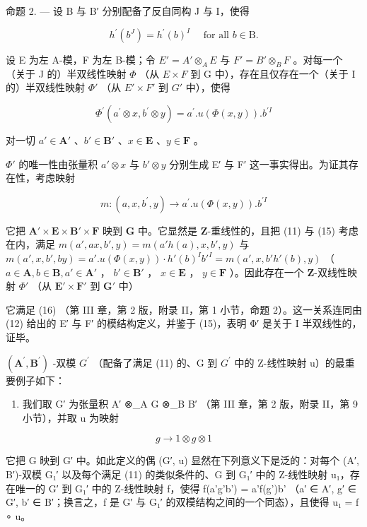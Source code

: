 命题 2. --- 设 B 与 B′ 分别配备了反自同构 J 与 I，使得

\[
h ^ {\prime} (b ^ {J}) = h ^ {\prime} (b) ^ {I} \quad \text { for all } b \in \mathrm{B}.\tag{15}
\]

设 E 为左 A-模，F 为左 B-模；令 \(E' = A' \otimes_{A} E\) 与 \(F' = B' \otimes_{B} F\) 。对每一个（关于 J 的）半双线性映射 \(\Phi\) （从 \(E \times F\) 到 G 中），存在且仅存在一个（关于 I 的）半双线性映射 \(\Phi'\) （从 \(E' \times F'\) 到 \(G'\) 中），使得

\[
\Phi^ {\prime} (a ^ {\prime} \otimes x, b ^ {\prime} \otimes y) = a ^ {\prime}. u (\Phi (x, y)). b ^ {\prime I}\tag{16}
\]

对一切 \(a' \in \mathbf{A}'\) 、\(b' \in \mathbf{B}'\) 、\(x \in \mathbf{E}\) 、\(y \in \mathbf{F}\) 。

\(\Phi'\) 的唯一性由张量积 \(a' \otimes x\) 与 \(b' \otimes y\) 分别生成 E′ 与 F′ 这一事实得出。为证其存在性，考虑映射

\[
m: (a, x, b ^ {\prime}, y) \rightarrow a ^ {\prime}. u (\Phi (x, y)). b ^ {\prime I}
\]

它把 \(\mathbf{A}' \times \mathbf{E} \times \mathbf{B}' \times \mathbf{F}\) 映到 \(\mathbf{G}\) 中。它显然是 \(\mathbf{Z}\)-重线性的，且把 (11) 与 (15) 考虑在内，满足 \(m(a', ax, b', y) = m(a'h(a), x, b', y)\) 与 \(m(a', x, b', by) = a'. u(\Phi(x, y)) \cdot h'(b)^{I} b'^{I} = m(a', x, b'h'(b), y)\) （ \(a \in \mathbf{A}, b \in \mathbf{B}, a' \in \mathbf{A}'\) ， \(b' \in \mathbf{B}'\) ， \(x \in \mathbf{E}\) ， \(y \in \mathbf{F}\) ）。因此存在一个 \(\mathbf{Z}\)-双线性映射 \(\Phi'\) （从 \(\mathbf{E}' \times \mathbf{F}'\) 到 \(\mathbf{G}'\) 中）

它满足 (16) （第 III 章，第 2 版，附录 II，第 1 小节，命题 2）。这一关系连同由 (12) 给出的 E′ 与 F′ 的模结构定义，并鉴于 (15)，表明 Φ′ 是关于 I 半双线性的，证毕。

\((\mathbf{A}^{\prime}, \mathbf{B}^{\prime})\) -双模 \(G^{\prime}\) （配备了满足 (11) 的、G 到 \(G^{\prime}\) 中的 Z-线性映射 u）的最重要例子如下：

\begin{enumerate}
\def\labelenumi{\arabic{enumi})}
\tightlist
\item
  我们取 G′ 为张量积 A′ ⊗\_A G ⊗\_B B′ （第 III 章，第 2 版，附录 II，第 9 小节），并取 u 为映射
\end{enumerate}

\[
g \to 1 \otimes g \otimes 1\tag{\(g\in G\)}
\]

它把 G 映到 G′ 中。如此定义的偶 (G′, u) 显然在下列意义下是泛的：对每个 (A′, B′)-双模 G₁′ 以及每个满足 (11) 的类似条件的、G 到 G₁′ 中的 Z-线性映射 u₁，存在唯一的 G′ 到 G₁′ 中的 Z-线性映射 f，使得 f(a'g'b') = a'f(g')b' （a′ ∈ A′, g′ ∈ G′, b′ ∈ B′；换言之，f 是 G′ 与 G₁′ 的双模结构之间的一个同态），且使得 u₁ = f ∘ u。

